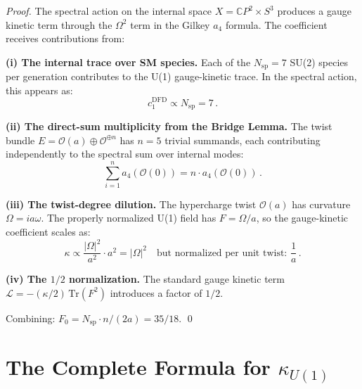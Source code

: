 \documentclass[12pt,a4paper]{article}
\theoremstyle{definition}
\begin{document}
\begin{proof}
The spectral action on the internal space $X = \mathbb{C}P^2 \times S^3$
produces a gauge kinetic term through the $\Omega^2$ term in the Gilkey
$a_4$ formula.  The coefficient receives contributions from:

\textbf{(i) The internal trace over SM species.}
Each of the $N_{\mathrm{sp}} = 7$ SU(2) species per generation
contributes to the U(1) gauge-kinetic trace.  In the spectral action,
this appears as:
\begin{equation}
c_1^{\mathrm{DFD}} \propto N_{\mathrm{sp}} = 7\,.
\end{equation}

\textbf{(ii) The direct-sum multiplicity from the Bridge Lemma.}
The twist bundle $E = \mathcal{O}(a) \oplus \mathcal{O}^{\oplus n}$
has $n = 5$ trivial summands, each contributing independently to the
spectral sum over internal modes:
\begin{equation}
\sum_{i=1}^{n} a_4(\mathcal{O}(0)) = n \cdot a_4(\mathcal{O}(0))\,.
\end{equation}

\textbf{(iii) The twist-degree dilution.}
The hypercharge twist $\mathcal{O}(a)$ has curvature $\Omega = ia\omega$.
The properly normalized U(1) field has $F = \Omega/a$, so the
gauge-kinetic coefficient scales as:
\begin{equation}
\kappa \propto \frac{|\Omega|^2}{a^2} \cdot a^2 = |\Omega|^2
\quad\text{but normalized per unit twist: } \frac{1}{a}\,.
\end{equation}

\textbf{(iv) The $1/2$ normalization.}
The standard gauge kinetic term $\mathcal{L} = -(\kappa/2)\,\mathrm{Tr}(F^2)$
introduces a factor of $1/2$.

Combining: $F_0 = N_{\mathrm{sp}} \cdot n / (2a) = 35/18$. \qed
\end{proof}

\section{The Complete Formula for $\kappa_{U(1)}$}
\label{sec:complete}
\end{document}
